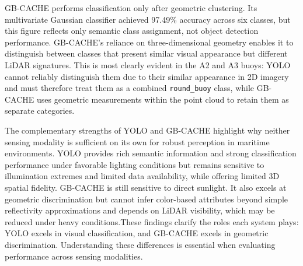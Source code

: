 \documentclass{erauthesis}
\begin{document}
GB-CACHE performs classification only after geometric clustering.
Its multivariate Gaussian classifier achieved 97.49\% accuracy across six classes, but this figure reflects only semantic class assignment, not object detection performance.
GB-CACHE’s reliance on three-dimensional geometry enables it to distinguish between classes that present similar visual appearance but different LiDAR signatures.
This is most clearly evident in the A2 and A3 buoys: YOLO cannot reliably distinguish them due to their similar appearance in 2D imagery and must therefore treat them as a combined \texttt{round\_buoy} class, while GB-CACHE uses geometric measurements within the point cloud to retain them as separate categories. 

The complementary strengths of YOLO and GB-CACHE highlight why neither sensing modality is sufficient on its own for robust perception in maritime environments.
YOLO provides rich semantic information and strong classification performance under favorable lighting conditions but remains sensitive to illumination extremes and limited data availability, while offering limited 3D spatial fidelity.
GB-CACHE is still sensitive to direct sunlight. It also excels at geometric discrimination but cannot infer color-based attributes beyond simple reflectivity approximations and depends on LiDAR visibility, which may be reduced under heavy conditions.These findings clarify the roles each system plays: YOLO excels in visual classification, and GB-CACHE excels in geometric discrimination. Understanding these differences is essential when evaluating performance across sensing modalities.


\end{document}
